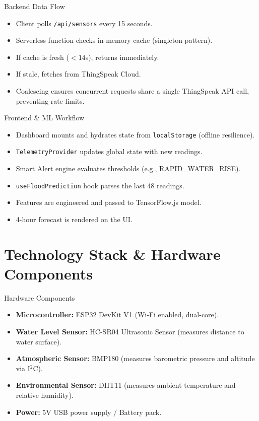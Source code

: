 \documentclass[aspectratio=169]{beamer}
\begin{document}
\begin{frame}{Backend Data Flow}
  \begin{itemize}
    \item Client polls \texttt{/api/sensors} every 15 seconds.
    \item Serverless function checks in-memory cache (singleton pattern).
    \item If cache is fresh ($< 14$s), returns immediately.
    \item If stale, fetches from ThingSpeak Cloud.
    \item Coalescing ensures concurrent requests share a single ThingSpeak API call, preventing rate limits.
  \end{itemize}
\end{frame}

\begin{frame}{Frontend \& ML Workflow}
  \begin{itemize}
    \item Dashboard mounts and hydrates state from \texttt{localStorage} (offline resilience).
    \item \texttt{TelemetryProvider} updates global state with new readings.
    \item Smart Alert engine evaluates thresholds (e.g., RAPID\_WATER\_RISE).
    \item \texttt{useFloodPrediction} hook parses the last 48 readings.
    \item Features are engineered and passed to TensorFlow.js model.
    \item 4-hour forecast is rendered on the UI.
  \end{itemize}
\end{frame}

\section{Technology Stack \& Hardware Components}

\begin{frame}{Hardware Components}
  \begin{itemize}
    \item \textbf{Microcontroller:} ESP32 DevKit V1 (Wi-Fi enabled, dual-core).
    \item \textbf{Water Level Sensor:} HC-SR04 Ultrasonic Sensor (measures distance to water surface).
    \item \textbf{Atmospheric Sensor:} BMP180 (measures barometric pressure and altitude via I$^2$C).
    \item \textbf{Environmental Sensor:} DHT11 (measures ambient temperature and relative humidity).
    \item \textbf{Power:} 5V USB power supply / Battery pack.
  \end{itemize}
\end{frame}
\end{document}
